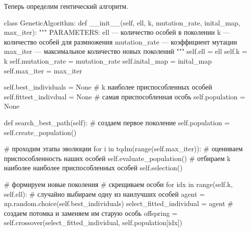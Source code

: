 Теперь определим гентический алгоритм.
\begin{pyin}
class GeneticAlgorithm:
  def __init__(self, ell, k, mutation_rate, inital_map, max_iter):
    """
    PARAMETERS:
    ell --- количество особей в поколении
    k --- количество особей для размножения
    mutation_rate --- коэффициент мутации
    max_iter --- максимальное количество новых поколений
    """
    self.ell = ell
    self.k = k
    self.mutation_rate = mutation_rate
    self.inital_map = inital_map
    self.max_iter = max_iter

    self.best_individuals = None # k наиболее приспособленных особей
    self.fittest_indivdual = None # самая приспособленная особь
    self.population = None

  def search_best_path(self):
    # создаем первое поколение
    self.population = self.create_population()

    # проходим этапы эволюции
    for i in tqdm(range(self.max_iter)):
       # оцениваем приспособленность наших особей
       self.evaluate_population()
       # отбираем k наиболее наиболее приспособленных особей
       self.selection()

       # формируем новые поколения
       # скрещиваем особи
       for idx in range(self.k, self.ell):
          # случайно выбираем одну из наилучших особей
          agent = np.random.choice(self.best_individuals)
          select_fitted_individual = agent
          # создаем потомка и заменяем им старую особь
          offspring = self.crossover(select_fitted_individual,
                                     self.population[idx])
\end{pyin}

